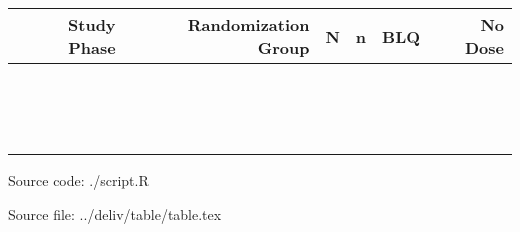 \documentclass[varwidth, border={10 5 50 5}]{standalone}
\begin{document}
\begin{tabular}{rrrrrr}
  \hline \hline
 Study Phase & Randomization Group & N & n & BLQ & No Dose \\ \hline
 \verb#183# & \verb#1# & \verb#16# & \verb#60# & \verb#0# & \verb#13# \\
 \verb#183# & \verb#2# & \verb#16# & \verb#86# & \verb#0# & \verb#11# \\
 \verb#183# & \verb#3# & \verb#16# & \verb#72# & \verb#0# & \verb#13# \\
 \verb#183# & \verb#4# & \verb#16# & \verb#57# & \verb#0# & \verb#7# \\
 \verb#183# & \verb#5# & \verb#16# & \verb#81# & \verb#0# & \verb#17# \\
 \verb#390# & \verb#1# & \verb#34# & \verb#116# & \verb#0# & \verb#9# \\
 \verb#390# & \verb#2# & \verb#36# & \verb#100# & \verb#0# & \verb#12# \\
 \verb#390# & \verb#3# & \verb#35# & \verb#110# & \verb#1# & \verb#12# \\
 \verb#390# & \verb#4# & \verb#31# & \verb#109# & \verb#1# & \verb#8# \\
 \verb#390# & \verb#5# & \verb#35# & \verb#93# & \verb#0# & \verb#6# \\
 \verb#620# & \verb#1# & \verb#57# & \verb#204# & \verb#11# & \verb#19# \\
 \verb#620# & \verb#2# & \verb#55# & \verb#200# & \verb#10# & \verb#6# \\
 \verb#620# & \verb#3# & \verb#57# & \verb#212# & \verb#9# & \verb#16# \\
 \verb#620# & \verb#4# & \verb#57# & \verb#205# & \verb#6# & \verb#15# \\
 \verb#620# & \verb#5# & \verb#57# & \verb#196# & \verb#14# & \verb#14# \\ \hline
\end{tabular}
 
{\raggedleft \tiny Source code: ./script.R}
 
\vspace{-5pt}
{\raggedleft \tiny Source file: ../deliv/table/table.tex}
\end{document}
